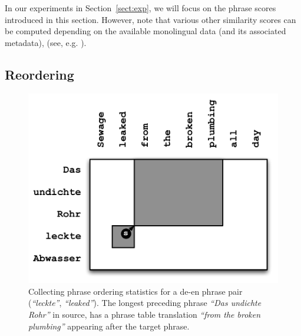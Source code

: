 \documentclass[11pt]{article}
\newcommand{\secref}[1]{Section~\ref{#1}}
\newcommand{\emq}[1]{\emph{``#1''}}
\begin{document}
In our experiments in \secref{sect:exp}, we will focus on the phrase scores introduced in this section.  However, note that various other similarity scores can be computed depending on the available monolingual data (and its associated metadata), (see, e.g. \cite{Schafer:2002}).

\subsection{Reordering} \label{sect:order}

\begin{figure}[t]
\begin{center}
\includegraphics[width=\linewidth]{../figures/monoreord/monoreord.pdf}
\caption{Collecting phrase ordering statistics for a de-en phrase pair (\emq{leckte}, \emq{leaked}).  The longest preceding phrase \emq{Das undichte Rohr} in source, has a phrase table translation \emq{from the broken plumbing} appearing after the target phrase.}
\label{fig:monoreord}
\end{center}
\vskip -0.2in
\end{figure}
\end{document}
